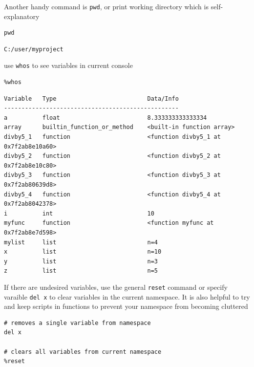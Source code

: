 \documentclass[%
oneside,                 %
final,                   %
10pt]{article}
\begin{document}
Another handy command is \texttt{pwd}, or print working directory which is self-explanatory
\begin{verbatim}
pwd
\end{verbatim}

\begin{verbatim}
C:/user/myproject
\end{verbatim}

use \texttt{whos} to see variables in current console

\begin{verbatim}
%whos
\end{verbatim}

\begin{verbatim}
Variable   Type                          Data/Info
--------------------------------------------------
a          float                         8.333333333333334
array      builtin_function_or_method    <built-in function array>
divby5_1   function                      <function divby5_1 at 0x7f2ab8e10a60>
divby5_2   function                      <function divby5_2 at 0x7f2ab8e10c80>
divby5_3   function                      <function divby5_3 at 0x7f2ab80639d8>
divby5_4   function                      <function divby5_4 at 0x7f2ab8042378>
i          int                           10
myfunc     function                      <function myfunc at 0x7f2ab8e7d598>
mylist     list                          n=4
x          list                          n=10
y          list                          n=3
z          list                          n=5
\end{verbatim}

If there are undesired variables, use the general \texttt{reset} command or specify varaible \texttt{del x} to clear variables in the current namespace. It is also helpful to try and keep scripts in functions to prevent your namespace from becoming cluttered

\begin{verbatim}
# removes a single variable from namespace
del x

# clears all variables from current namespace
%reset
\end{verbatim}
\end{document}
